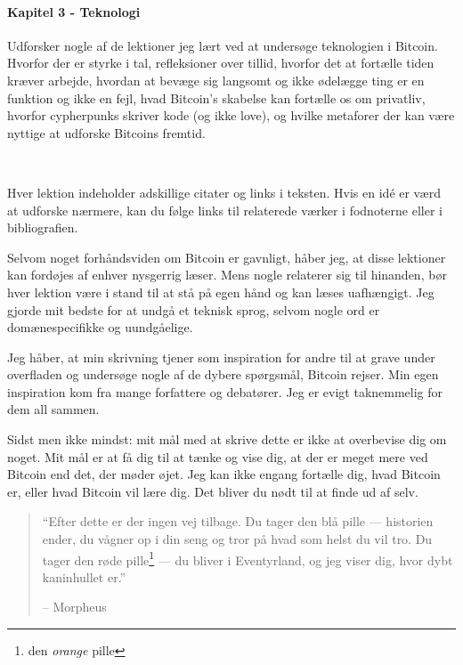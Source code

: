 \paragraph{Kapitel 3 - Teknologi} 
Udforsker nogle af de lektioner jeg lært ved at undersøge teknologien i 
Bitcoin. Hvorfor der er styrke i tal, refleksioner over tillid, hvorfor det at 
fortælle tiden kræver arbejde, hvordan at bevæge sig langsomt og ikke ødelægge 
ting er en funktion og ikke en fejl, hvad Bitcoin's skabelse kan fortælle os 
om privatliv, hvorfor cypherpunks skriver kode (og ikke love), og hvilke 
metaforer der kan være nyttige at udforske Bitcoins fremtid.

~

Hver lektion indeholder adskillige citater og links i teksten. Hvis en idé er
værd at udforske nærmere, kan du følge links til relaterede værker i
fodnoterne eller i bibliografien.

Selvom noget forhåndsviden om Bitcoin er gavnligt, håber jeg, at disse
lektioner kan fordøjes af enhver nysgerrig læser. Mens nogle relaterer sig til 
hinanden, bør hver lektion være i stand til at stå på egen hånd og kan læses 
uafhængigt. Jeg gjorde mit bedste for at undgå et teknisk sprog, selvom nogle
ord er domænespecifikke og uundgåelige.

Jeg håber, at min skrivning tjener som inspiration for andre til at grave under
overfladen og undersøge nogle af de dybere spørgsmål, Bitcoin rejser. Min egen
inspiration kom fra mange forfattere og debatører. Jeg er evigt taknemmelig for
dem all sammen.

Sidst men ikke mindst: mit mål med at skrive dette er ikke at overbevise dig om 
noget. Mit mål er at få dig til at tænke og vise dig, at der er meget mere ved 
Bitcoin end det, der møder øjet. Jeg kan ikke engang fortælle dig, hvad Bitcoin 
er, eller hvad Bitcoin vil lære dig. Det bliver du nødt til at finde ud af selv.

\begin{quotation}\begin{samepage}
\enquote{Efter dette er der ingen vej tilbage. Du tager den blå pille --- 
historien ender, du vågner op i din seng og tror på hvad som helst du vil tro. 
Du tager den røde pille\footnote{den \textit{orange} pille} --- du bliver i 
Eventyrland, og jeg viser dig, hvor dybt kaninhullet er.}
\begin{flushright} -- Morpheus
\end{flushright}\end{samepage}\end{quotation}

